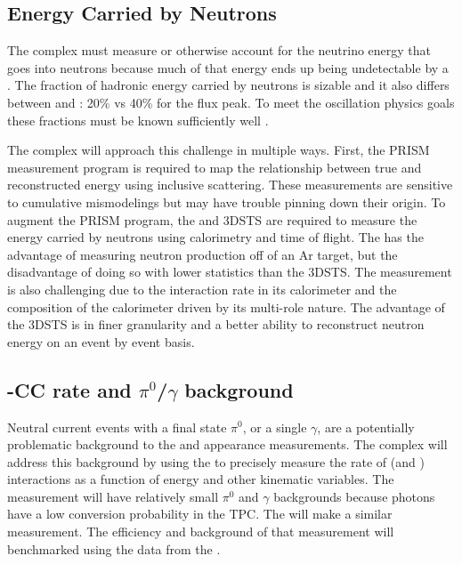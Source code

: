 \subsection{Energy Carried by Neutrons}

The   complex must measure or otherwise account for the neutrino energy that goes into neutrons because much of that energy ends up being undetectable by a . The fraction of hadronic energy carried by neutrons is sizable and it also differs between \numu and \anumu: 20\% vs 40\% for the flux peak. To meet the oscillation physics goals these fractions must be known sufficiently well .

The complex will approach this challenge in multiple ways. First, the PRISM measurement program is required to map the relationship between true and reconstructed energy using inclusive  scattering. These measurements are sensitive to cumulative mismodelings but may have trouble pinning down their origin. To augment the PRISM program, the  and 3DSTS are required to measure the energy carried by neutrons using calorimetry and time of flight.  The  has the advantage of measuring neutron production off of an Ar target, but the disadvantage of doing so with lower statistics than the 3DSTS. The  measurement is also challenging due to the interaction rate in its calorimeter and the composition of the calorimeter driven by its multi-role nature. The advantage of the 3DSTS is in finer granularity and a better ability to reconstruct neutron energy on an event by event basis.



\subsection{\nue-CC rate and $\pi^0$/$\gamma$ background}

Neutral current events with a final state $\pi^0$, or a single $\gamma$, are a potentially problematic background to the \nue and \anue appearance measurements. The   complex will address this background by using the  to precisely measure the rate of \nue (and \anue)  interactions as a function of energy and other kinematic variables. The measurement will have relatively small $\pi^0$ and $\gamma$ backgrounds because photons have a low conversion probability in the  TPC. The \larnd will make a similar measurement. The efficiency and background of that measurement will benchmarked using the data from the . 

